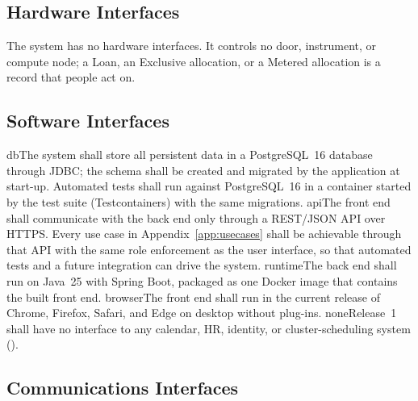 \subsection{Hardware Interfaces}

The system has no hardware interfaces. It controls no door, instrument, or compute node; a Loan, an Exclusive allocation, or a Metered allocation is a record that people act on.

\subsection{Software Interfaces}

\si{db}{The system shall store all persistent data in a PostgreSQL~16 database through JDBC; the schema shall be created and migrated by the application at start-up. Automated tests shall run against PostgreSQL~16 in a container started by the test suite (Testcontainers) with the same migrations.}
\si{api}{The front end shall communicate with the back end only through a REST/JSON API over HTTPS. Every use case in Appendix~\ref{app:usecases} shall be achievable through that API with the same role enforcement as the user interface, so that automated tests and a future integration can drive the system.}
\si{runtime}{The back end shall run on Java~25 with Spring Boot, packaged as one Docker image that contains the built front end.}
\si{browser}{The front end shall run in the current release of Chrome, Firefox, Safari, and Edge on desktop without plug-ins.}
\si{none}{Release~1 shall have no interface to any calendar, HR, identity, or cluster-scheduling system ().}

\subsection{Communications Interfaces}

